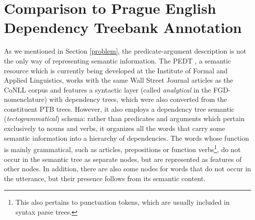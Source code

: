 \documentclass[12pt,notitlepage]{report}
\begin{document}
\section{Comparison to Prague English Dependency Treebank Annotation}\label{pedt}

As we mentioned in Section \ref{problem}, the predicate-argument description is not the only way of representing semantic information. The PEDT \citep{cinkova09}, a semantic resource which is currently being developed at the Institute of Formal and Applied Linguistics, works with the same Wall Street Journal articles as the CoNLL corpus and features a syntactic layer (called \emph{analytical} in the FGD-nomenclature) with dependency trees, which were also converted from the constituent PTB trees. However, it also employs a dependency tree semantic (\emph{tectogrammatical}) schema: rather than predicates and arguments which pertain exclusively to nouns and verbs, it organizes all the words that carry some semantic information into a hierarchy of dependencies. The words whose function is mainly grammatical, such as articles, prepositions or function verbs\footnote{This also pertains to punctuation tokens, which are usually included in syntax parse trees.}, do not occur in the semantic tree as separate nodes, but are represented as features of other nodes. In addition, there are also some nodes for words that do not occur in the utterance, but their presence follows from its semantic content. 
\end{document}
